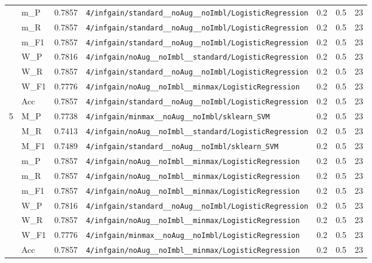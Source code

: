 \begin{table}[htbp]
\begin{tabular}{|c|l|c|>{\ttfamily\footnotesize}p{7.2cm}|c|c|c|}
 & m\_P & 0.7857 & \texttt{4/infgain/standard\_\_noAug\_\_noImbl/LogisticRegression} & 0.2 & 0.5  & 23 \\ 
 & m\_R & 0.7857 & \texttt{4/infgain/standard\_\_noAug\_\_noImbl/LogisticRegression} & 0.2 & 0.5  & 23 \\ 
 & m\_F1 & 0.7857 & \texttt{4/infgain/standard\_\_noAug\_\_noImbl/LogisticRegression} & 0.2 & 0.5  & 23 \\ 
 & W\_P & 0.7816 & \texttt{4/infgain/noAug\_\_noImbl\_\_standard/LogisticRegression} & 0.2 & 0.5  & 23 \\ 
 & W\_R & 0.7857 & \texttt{4/infgain/standard\_\_noAug\_\_noImbl/LogisticRegression} & 0.2 & 0.5  & 23 \\ 
 & W\_F1 & 0.7776 & \texttt{4/infgain/noAug\_\_noImbl\_\_minmax/LogisticRegression} & 0.2 & 0.5  & 23 \\ 
 & Acc & 0.7857 & \texttt{4/infgain/standard\_\_noAug\_\_noImbl/LogisticRegression} & 0.2 & 0.5  & 23 \\ 
\hline
\multirow{10}{*}{5} & M\_P & 0.7738 & \texttt{4/infgain/minmax\_\_noAug\_\_noImbl/sklearn\_SVM} & 0.2 & 0.5  & 23 \\ 
 & M\_R & 0.7413 & \texttt{4/infgain/noAug\_\_noImbl\_\_standard/LogisticRegression} & 0.2 & 0.5  & 23 \\ 
 & M\_F1 & 0.7489 & \texttt{4/infgain/standard\_\_noAug\_\_noImbl/sklearn\_SVM} & 0.2 & 0.5  & 23 \\ 
 & m\_P & 0.7857 & \texttt{4/infgain/noAug\_\_noImbl\_\_minmax/LogisticRegression} & 0.2 & 0.5  & 23 \\ 
 & m\_R & 0.7857 & \texttt{4/infgain/noAug\_\_noImbl\_\_minmax/LogisticRegression} & 0.2 & 0.5  & 23 \\ 
 & m\_F1 & 0.7857 & \texttt{4/infgain/noAug\_\_noImbl\_\_minmax/LogisticRegression} & 0.2 & 0.5  & 23 \\ 
 & W\_P & 0.7816 & \texttt{4/infgain/standard\_\_noAug\_\_noImbl/LogisticRegression} & 0.2 & 0.5  & 23 \\ 
 & W\_R & 0.7857 & \texttt{4/infgain/noAug\_\_noImbl\_\_minmax/LogisticRegression} & 0.2 & 0.5  & 23 \\ 
 & W\_F1 & 0.7776 & \texttt{4/infgain/minmax\_\_noAug\_\_noImbl/LogisticRegression} & 0.2 & 0.5  & 23 \\ 
 & Acc & 0.7857 & \texttt{4/infgain/noAug\_\_noImbl\_\_minmax/LogisticRegression} & 0.2 & 0.5  & 23 \\ 
\hline
\end{tabular}
\end{table}